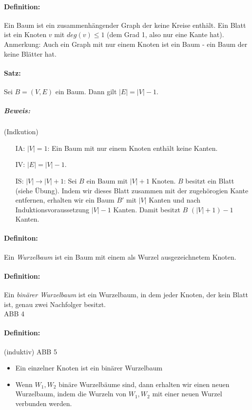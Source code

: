\paragraph{Definition:} Ein Baum ist ein zusammenhängender Graph der keine Kreise enthält. Ein Blatt ist ein Knoten $v$ mit $deg(v)\leq 1$ (dem Grad 1, also nur eine Kante hat).\\
Anmerkung: Auch ein Graph mit nur einem Knoten ist ein Baum - ein Baum der keine Blätter hat.

\paragraph{Satz:} Sei $B=(V,E)$ ein Baum. Dann gilt $|E|=|V|-1$.

\subparagraph{Beweis:} (Indkution)
\begin{itemize}
\item[IA:] $|V|=1$: Ein Baum mit nur einem Knoten enthält keine Kanten.
\item[IV:] $|E|=|V|-1$.
\item[IS:]$|V| \rightarrow |V| +1$: Sei $B$ ein Baum mit $|V|+1$ Knoten. $B$ besitzt ein Blatt (siehe Übung). Indem wir dieses Blatt zusammen mit der zugehörogien Kante entfernen, erhalten wir ein Baum $B'$ mit $|V|$ Kanten und nach Induktionsvoraussetzung $|V|-1$ Kanten. Damit besitzt $B$ $(|V|+1)-1$ Kanten.
\end{itemize}

\paragraph{Definiton:} Ein \emph{Wurzelbaum} ist ein Baum mit einem als Wurzel ausgezeichnetem Knoten.

\paragraph{Definition:} Ein \emph{binärer Wurzelbaum} ist ein Wurzelbaum, in dem jeder Knoten, der kein Blatt ist, genau zwei Nachfolger besitzt.\\
ABB 4
\paragraph{Definition:}  (induktiv)
ABB 5
\begin{itemize}
\item Ein einzelner Knoten ist ein binärer Wurzelbaum
\item Wenn $W_1, W_2$ binäre Wurzelbäume sind, dann erhalten wir einen neuen Wurzelbaum, indem die Wurzeln von $W_1,W_2$ mit einer neuen Wurzel verbunden werden.
\end{itemize}
